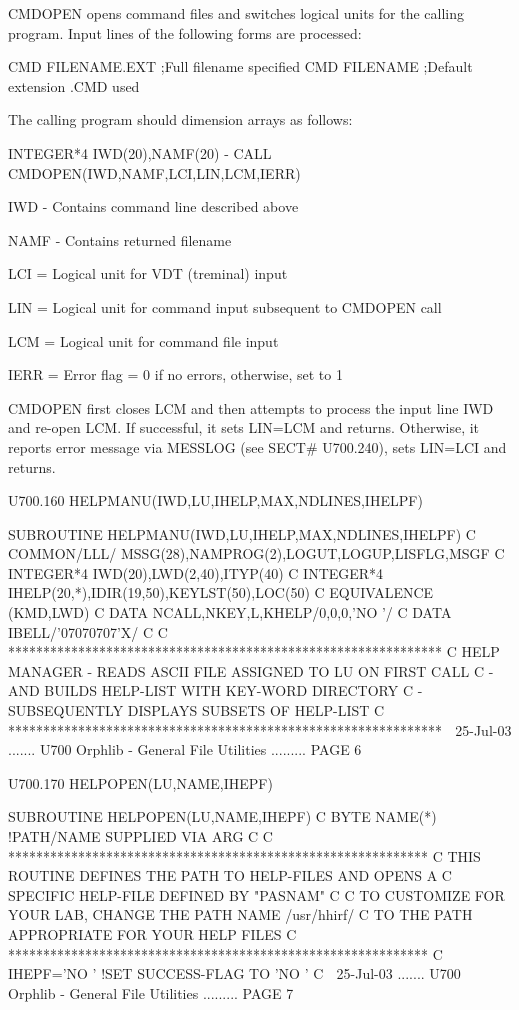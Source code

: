    CMDOPEN  opens  command  files  and  switches logical units for the calling
   program. Input lines of the following forms are processed:
 
   CMD FILENAME.EXT                        ;Full filename specified
   CMD FILENAME                            ;Default extension .CMD used
 
   The calling program should dimension arrays as follows:
 
          INTEGER*4 IWD(20),NAMF(20)
             -
          CALL CMDOPEN(IWD,NAMF,LCI,LIN,LCM,IERR)
 
   IWD  - Contains command line described above
 
   NAMF - Contains returned filename
 
   LCI  = Logical unit for VDT (treminal) input
 
   LIN  = Logical unit for command input subsequent to CMDOPEN call
 
   LCM  = Logical unit for command file input
 
   IERR = Error flag = 0 if no errors, otherwise, set to 1
 
   CMDOPEN first closes LCM and then attempts to process the  input  line  IWD
   and  re-open LCM. If successful, it sets LIN=LCM and returns. Otherwise, it
   reports error message via MESSLOG (see SECT# U700.240),  sets  LIN=LCI  and
   returns.
 
 
   U700.160  HELPMANU(IWD,LU,IHELP,MAX,NDLINES,IHELPF)
 
         SUBROUTINE HELPMANU(IWD,LU,IHELP,MAX,NDLINES,IHELPF)
   C
         COMMON/LLL/  MSSG(28),NAMPROG(2),LOGUT,LOGUP,LISFLG,MSGF
   C
         INTEGER*4 IWD(20),LWD(2,40),ITYP(40)
   C
         INTEGER*4 IHELP(20,*),IDIR(19,50),KEYLST(50),LOC(50)
   C
         EQUIVALENCE (KMD,LWD)
   C
         DATA NCALL,NKEY,L,KHELP/0,0,0,'NO  '/
   C
         DATA IBELL/'07070707'X/
   C
   C     **************************************************************
   C     HELP MANAGER - READS ASCII FILE ASSIGNED TO LU ON FIRST CALL
   C                  - AND BUILDS HELP-LIST WITH KEY-WORD DIRECTORY
   C                  - SUBSEQUENTLY DISPLAYS SUBSETS OF HELP-LIST
   C     **************************************************************
    
   25-Jul-03 ....... U700  Orphlib - General File Utilities ......... PAGE   6
 
 
   U700.170  HELPOPEN(LU,NAME,IHEPF)
 
         SUBROUTINE HELPOPEN(LU,NAME,IHEPF)
   C
         BYTE          NAME(*)         !PATH/NAME SUPPLIED VIA ARG
   C
   C     ************************************************************
   C     THIS ROUTINE DEFINES THE PATH TO HELP-FILES AND OPENS A
   C     SPECIFIC HELP-FILE DEFINED BY "PASNAM"
   C
   C     TO CUSTOMIZE FOR YOUR LAB, CHANGE THE PATH NAME /usr/hhirf/
   C     TO THE PATH APPROPRIATE FOR YOUR HELP FILES
   C     ************************************************************
   C
         IHEPF='NO  '               !SET SUCCESS-FLAG TO 'NO  '
   C
    
   25-Jul-03 ....... U700  Orphlib - General File Utilities ......... PAGE   7
 
